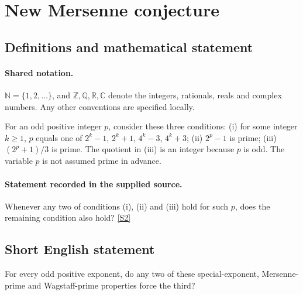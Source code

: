 \documentclass[11pt]{article}
\newcommand{\sref}[2]{\hyperlink{source:#1:#2}{[S#2]}}
\begin{document}
\section{New Mersenne conjecture}\label{statement}

\subsection{Definitions and mathematical statement}

\paragraph{Shared notation.}$\mathbb N=\{1,2,\ldots\}$, and $\mathbb Z,\mathbb Q,\mathbb R,\mathbb C$ denote the integers, rationals, reals and complex numbers. Any other conventions are specified locally.


For an odd positive integer $p$, consider these three conditions: (i) for some integer $k\ge1$, $p$ equals one of $2^k-1$, $2^k+1$, $4^k-3$, $4^k+3$; (ii) $2^p-1$ is prime; (iii) $(2^p+1)/3$ is prime. The quotient in (iii) is an integer because $p$ is odd. The variable $p$ is not assumed prime in advance.
\paragraph{Statement recorded in the supplied source.}
Whenever any two of conditions (i), (ii) and (iii) hold for such $p$, does the remaining condition also hold? \sref{statement}{2}
\subsection{Short English statement}
For every odd positive exponent, do any two of these special-exponent, Mersenne-prime and Wagstaff-prime properties force the third?
\end{document}
